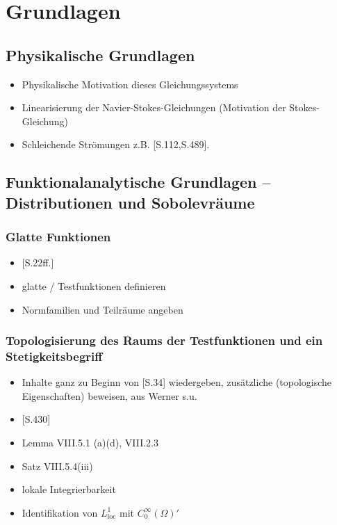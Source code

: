 \chapter{Grundlagen}
\label{cp:grundlagen}

\section{Physikalische Grundlagen}

\begin{itemize}
  \item Physikalische Motivation dieses Gleichungssystems
  \item Linearisierung der Navier-Stokes-Gleichungen (Motivation der Stokes-Gleichung)
  \item Schleichende Strömungen z.B. \cite{spurk10stroemungslehre}[S.112,S.489]. 
\end{itemize}

\section{Funktionalanalytische Grundlagen -- Distributionen und Sobolevräume}

\subsection{Glatte Funktionen}

\begin{itemize}
  \item \cite{sohr2001navier}[S.22ff.]
  \item glatte / Testfunktionen definieren
  \item Normfamilien und Teilräume angeben
\end{itemize}

\subsection{Topologisierung des Raums der Testfunktionen und ein Stetigkeitsbegriff}

\begin{itemize}
  \item Inhalte ganz zu Beginn von \cite{sohr2001navier}[S.34] wiedergeben, zusätzliche (topologische Eigenschaften) beweisen, aus Werner s.u.
  \item \cite{werner2011fa}[S.430]
  \item Lemma VIII.5.1 (a)(d), VIII.2.3
  \item Satz VIII.5.4(iii)
  \item lokale Integrierbarkeit
  \item Identifikation von $L^1_{\mathrm{loc}}$ mit $C_0^\infty(\Omega)'$
\end{itemize}

